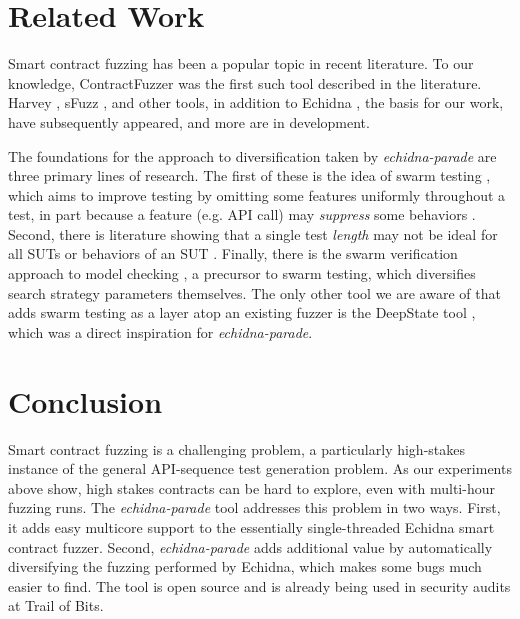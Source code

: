 \documentclass[sigconf]{acmart}
\begin{document}
{\section{Related Work}

Smart contract fuzzing has been a popular topic in recent literature.  To our knowledge, ContractFuzzer \cite{jiang:ase:2018} was the first such tool described in the literature.  Harvey \cite{harvey}, sFuzz \cite{sfuzz}, and other tools, in addition to Echidna \cite{echidnaissta}, the basis for our work, have subsequently appeared, and more are in development.

The foundations for the approach to diversification taken by \emph{echidna-parade} are three primary lines of research.  The first of these is the idea of swarm testing \cite{ISSTA12}, which aims to improve testing by omitting some features uniformly throughout a test, in part because a feature (e.g. API call) may \emph{suppress} some behaviors \cite{groce2013help}.   Second, there is literature showing that a single test \emph{length} may not be ideal for all SUTs or behaviors of an SUT \cite{ASE08,ArcuriLen}.  Finally, there is the swarm verification approach to model checking \cite{swarmIEEE}, a precursor to swarm testing, which diversifies search strategy parameters themselves.  The only other tool we are aware of that adds swarm testing as a layer atop an existing fuzzer is the DeepState tool \cite{goodman2018deepstate}, which was a direct inspiration for \emph{echidna-parade}.

\section{Conclusion}

Smart contract fuzzing is a challenging problem, a particularly high-stakes instance of the general API-sequence test generation problem.  As our experiments above show, high stakes contracts can be hard to explore, even with multi-hour fuzzing runs.  The \emph{echidna-parade} tool addresses this problem in two ways.  First, it adds easy multicore support to the essentially single-threaded Echidna smart contract fuzzer.  Second, \emph{echidna-parade} adds additional value by automatically diversifying the fuzzing performed by Echidna, which makes some bugs much easier to find.  The tool is open source and is already being used in security audits at Trail of Bits.




\newpage

}
\end{document}
